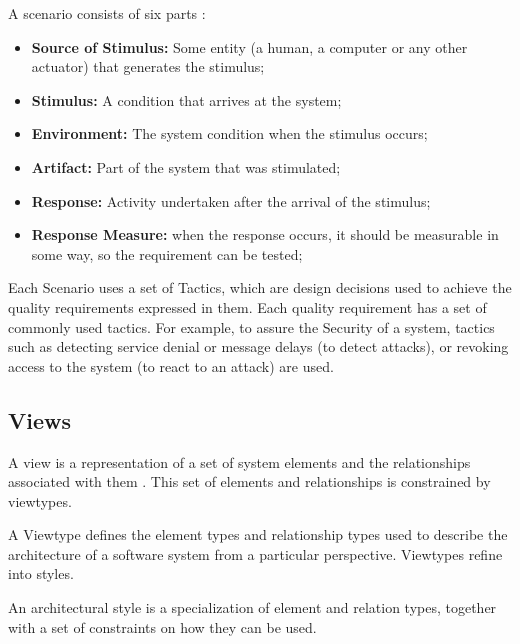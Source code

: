 A scenario consists of six parts \cite{bass2003software}:
\begin{itemize}
\item \textbf{Source of Stimulus:} Some entity (a human, a computer or any other actuator) that generates the stimulus;
\item \textbf{Stimulus:} A condition that arrives at the system;
\item \textbf{Environment:} The system condition when the stimulus occurs;
\item \textbf{Artifact:} Part of the system that was stimulated;
\item \textbf{Response:} Activity undertaken after the arrival of the stimulus;
\item \textbf{Response Measure:} when the response occurs, it should be measurable in some way, so the requirement can be tested;
\end{itemize}

Each Scenario uses a set of Tactics, which are design decisions used to achieve the quality requirements expressed in them. Each quality requirement has a set of commonly used tactics. For example, to assure the Security of a system, tactics such as detecting service denial or message delays (to detect attacks), or revoking access to the system (to react to an attack) are used.

\subsection{Views}
\label{subsection:domainModelViews}
A view is a representation of a set of system elements and the relationships associated with them \cite{clements2003documenting}. This set of elements and relationships is constrained by viewtypes.

A Viewtype defines the element types and relationship types used to describe the architecture of a software system from a particular perspective. Viewtypes refine into styles.

An architectural style is a specialization of element and relation types, together with a set of constraints on how they can be used.

